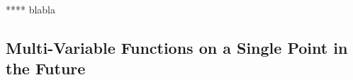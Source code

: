 \documentclass[10pt]{paper}
\theoremstyle{definition}
\newcommand{\states}{\mathcal{X}}
\newcommand{\gambles}{\mathcal{L}}
\begin{document}
**** blabla

%
%

\subsection{Multi-Variable Functions on a Single Point in the Future}\label{sec:function_single_future_multiple_past}
\end{document}
